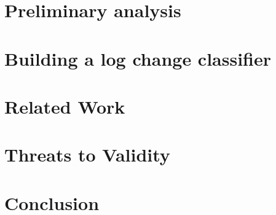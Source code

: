 %

\section{Preliminary analysis}

\label{analysis}



\section{Building a log change classifier}
%
\label{prediction}




\section{Related Work }
\label{related}


\section{Threats to Validity}
\label{threats}


\section{Conclusion }
\label{conc}










